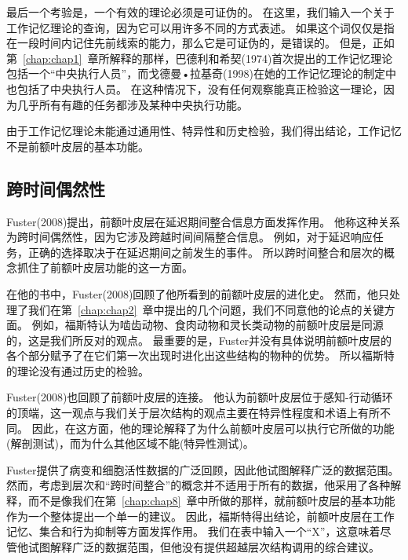 最后一个考验是，一个有效的理论必须是可证伪的。
在这里，我们输入一个关于工作记忆理论的查询，因为它可以用许多不同的方式表述。
如果这个词仅仅是指在一段时间内记住先前线索的能力，那么它是可证伪的，是错误的。
但是，正如第~\ref{chap:chap1}~章所解释的那样，巴德利和希契(1974)首次提出的工作记忆理论包括一个“中央执行人员”，而戈德曼•拉基奇(1998)在她的工作记忆理论的制定中也包括了中央执行人员。
在这种情况下，没有任何观察能真正检验这一理论，因为几乎所有有趣的任务都涉及某种中央执行功能。
\par


由于工作记忆理论未能通过通用性、特异性和历史检验，我们得出结论，工作记忆不是前额叶皮层的基本功能。



\subsection{跨时间偶然性}

Fuster(2008)提出，前额叶皮层在延迟期间整合信息方面发挥作用。
他称这种关系为跨时间偶然性，因为它涉及跨越时间间隔整合信息。
例如，对于延迟响应任务，正确的选择取决于在延迟期间之前发生的事件。
所以跨时间整合和层次的概念抓住了前额叶皮层功能的这一方面。
\par


在他的书中，Fuster(2008)回顾了他所看到的前额叶皮层的进化史。
然而，他只处理了我们在第~\ref{chap:chap2}~章中提出的几个问题，我们不同意他的论点的关键方面。
例如，福斯特认为啮齿动物、食肉动物和灵长类动物的前额叶皮层是同源的，这是我们所反对的观点。
最重要的是，Fuster并没有具体说明前额叶皮层的各个部分赋予了在它们第一次出现时进化出这些结构的物种的优势。
所以福斯特的理论没有通过历史的检验。


\par 
Fuster(2008)也回顾了前额叶皮层的连接。
他认为前额叶皮层位于感知-行动循环的顶端，这一观点与我们关于层次结构的观点主要在特异性程度和术语上有所不同。
因此，在这方面，他的理论解释了为什么前额叶皮层可以执行它所做的功能(解剖测试)，而为什么其他区域不能(特异性测试)。
\par


Fuster提供了病变和细胞活性数据的广泛回顾，因此他试图解释广泛的数据范围。
然而，考虑到层次和“跨时间整合”的概念并不适用于所有的数据，他采用了各种解释，而不是像我们在第~\ref{chap:chap8}~章中所做的那样，就前额叶皮层的基本功能作为一个整体提出一个单一的建议。
因此，福斯特得出结论，前额叶皮层在工作记忆、集合和行为抑制等方面发挥作用。
我们在表中输入一个“X”，这意味着尽管他试图解释广泛的数据范围，但他没有提供超越层次结构调用的综合建议。


